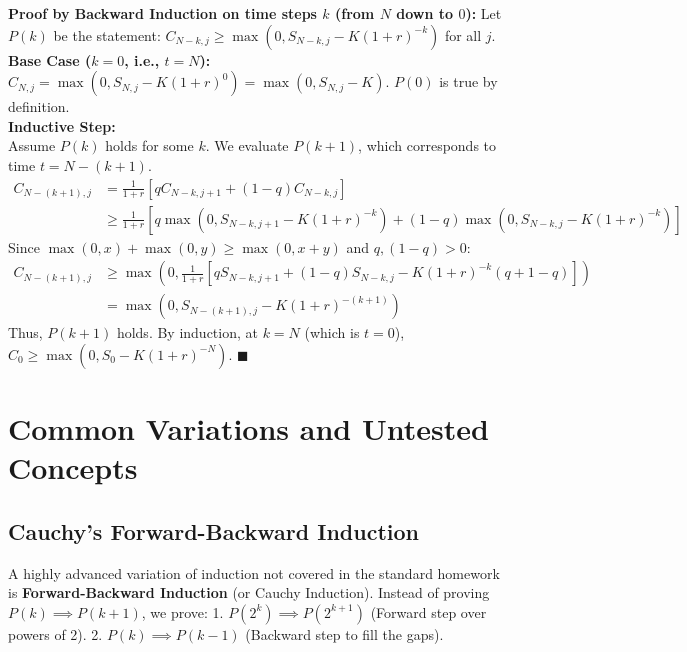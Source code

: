 \documentclass[11pt, a4paper]{article}
\theoremstyle{definition}
\theoremstyle{remark}
\begin{document}
\textbf{Proof by Backward Induction on time steps $k$ (from $N$ down to $0$):}
Let $P(k)$ be the statement: $C_{N-k, j} \ge \max(0, S_{N-k, j} - K(1+r)^{-k})$ for all $j$.
\vspace{4pt} \\
\textbf{Base Case ($k=0$, i.e., $t=N$):} \\
$C_{N, j} = \max(0, S_{N, j} - K(1+r)^0) = \max(0, S_{N, j} - K)$. $P(0)$ is true by definition.
\vspace{4pt} \\
\textbf{Inductive Step:} \\
Assume $P(k)$ holds for some $k$. We evaluate $P(k+1)$, which corresponds to time $t = N - (k+1)$.
\begin{align*}
C_{N-(k+1), j} &= \frac{1}{1+r} \left[ q C_{N-k, j+1} + (1-q) C_{N-k, j} \right] \\
&\ge \frac{1}{1+r} \left[ q \max(0, S_{N-k, j+1} - K(1+r)^{-k}) + (1-q) \max(0, S_{N-k, j} - K(1+r)^{-k}) \right]
\end{align*}
Since $\max(0, x) + \max(0, y) \ge \max(0, x+y)$ and $q, (1-q) > 0$:
\begin{align*}
C_{N-(k+1), j} &\ge \max\left(0, \frac{1}{1+r} \left[ q S_{N-k, j+1} + (1-q) S_{N-k, j} - K(1+r)^{-k}(q + 1 - q) \right] \right) \\
&= \max\left(0, S_{N-(k+1), j} - K(1+r)^{-(k+1)} \right)
\end{align*}
Thus, $P(k+1)$ holds. By induction, at $k=N$ (which is $t=0$), $C_0 \ge \max(0, S_0 - K(1+r)^{-N})$. $\blacksquare$

\newpage

\section{Common Variations and Untested Concepts}

\subsection{Cauchy's Forward-Backward Induction}
A highly advanced variation of induction not covered in the standard homework is \textbf{Forward-Backward Induction} (or Cauchy Induction). Instead of proving $P(k) \implies P(k+1)$, we prove:
1. $P(2^k) \implies P(2^{k+1})$ (Forward step over powers of 2).
2. $P(k) \implies P(k-1)$ (Backward step to fill the gaps).
\end{document}
